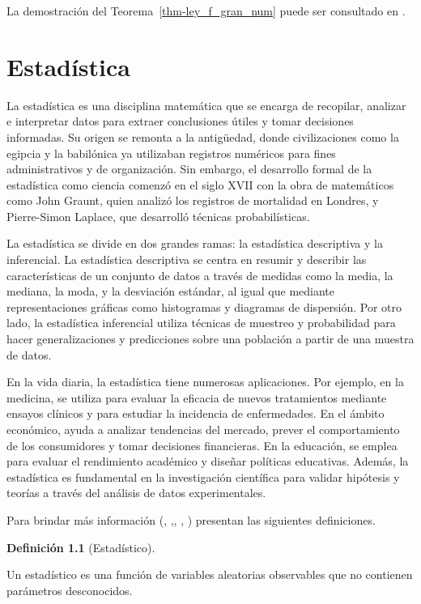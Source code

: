 \documentclass[
  us-letterpaper,
]{scrreprt}
\theoremstyle{plain}
\theoremstyle{plain}
\theoremstyle{definition}
\newtheorem{definition}{Definición}[chapter]
\theoremstyle{remark}
\begin{document}
La demostración del Teorema~\ref{thm-ley_f_gran_num} puede ser
consultado en \autocite{ross2015first}.

\chapter{Estadística}\label{estaduxedstica}

La estadística es una disciplina matemática que se encarga de recopilar,
analizar e interpretar datos para extraer conclusiones útiles y tomar
decisiones informadas. Su origen se remonta a la antigüedad, donde
civilizaciones como la egipcia y la babilónica ya utilizaban registros
numéricos para fines administrativos y de organización. Sin embargo, el
desarrollo formal de la estadística como ciencia comenzó en el siglo
XVII con la obra de matemáticos como John Graunt, quien analizó los
registros de mortalidad en Londres, y Pierre-Simon Laplace, que
desarrolló técnicas probabilísticas.

La estadística se divide en dos grandes ramas: la estadística
descriptiva y la inferencial. La estadística descriptiva se centra en
resumir y describir las características de un conjunto de datos a través
de medidas como la media, la mediana, la moda, y la desviación estándar,
al igual que mediante representaciones gráficas como histogramas y
diagramas de dispersión. Por otro lado, la estadística inferencial
utiliza técnicas de muestreo y probabilidad para hacer generalizaciones
y predicciones sobre una población a partir de una muestra de datos.

En la vida diaria, la estadística tiene numerosas aplicaciones. Por
ejemplo, en la medicina, se utiliza para evaluar la eficacia de nuevos
tratamientos mediante ensayos clínicos y para estudiar la incidencia de
enfermedades. En el ámbito económico, ayuda a analizar tendencias del
mercado, prever el comportamiento de los consumidores y tomar decisiones
financieras. En la educación, se emplea para evaluar el rendimiento
académico y diseñar políticas educativas. Además, la estadística es
fundamental en la investigación científica para validar hipótesis y
teorías a través del análisis de datos experimentales.

Para brindar más información (\autocite{walpole2012probabilidad},
\autocite{jones1994book},\autocite{massey1951kolmogorov},
\autocite{wackerly2009estadística}, \autocite{mood1986introduction})
presentan las siguientes definiciones.

\begin{definition}[Estadístico]\protect\hypertarget{def-estadis}{}\label{def-estadis}

Un estadístico es una función de variables aleatorias observables que no
contienen parámetros desconocidos.

\end{definition}
\end{document}
